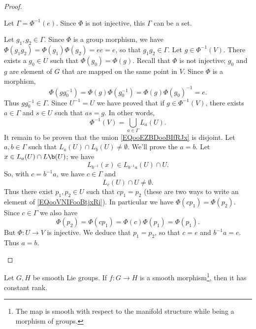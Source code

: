 \begin{theorem}
\begin{proof}
\begin{subproof}
		Let \( \Gamma=\Phi^{-1}(e)\). Since \( \Phi\) is not injective, this \( \Gamma\) can be a set.
		\begin{subproof}
			Let \( g_1,g_2\in \Gamma\). Since \( \Phi\) is a group morphism, we have \( \Phi(g_1g_2)=\Phi(g_1)\Phi(g_2)=ee=e\), so that \( g_1g_2\in \Gamma\).
			\spitem[As an union]
			Let \( g\in\Phi^{-1}(V)\). There exists a \( g_0\in U\) such that \( \Phi(g_0)=\Phi(g)\). Recall that \( \Phi\) is not injective; \( g_0\) and \( g\) are element of \( G\) that are mapped on the same point in \( V\). Since \( \Phi\) is a morphism,
			\begin{equation}
				\Phi(gg_0^{-1})=\Phi(g)\Phi(g_0^{-1})=\Phi(g)\Phi(g_0)^{-1}=e.
			\end{equation}
			Thus \( gg_0^{-1}\in \Gamma\). Since \( U^{-1}=U\) we have proved that if \( g\in \Phi^{-1}(V)\), there exists \( a\in \Gamma\) and \( s\in U\) such that \( as=g\). In other words,
			\begin{equation}        \label{EQooEZBDooBIfRJx}
				\Phi^{-1}(V)=\bigcup_{a\in \Gamma}L_a(U).
			\end{equation}
			\spitem[Disjoint]
			It remain to be proven that the union \eqref{EQooEZBDooBIfRJx} is disjoint. Let \( a,b\in \Gamma\) such that \( L_a(U)\cap L_b(U)\neq \emptyset\). We'll prove the \( a=b\). Let \( x\in L_a(U)\cap L\b(U)\); we have
			\begin{equation}
				L_{b^{-1}}(x)\in L_{b^{-1} a}(U)\cap U.
			\end{equation}
			So, with \( c=b^{-1} a\), we have \( c\in\Gamma\) and
			\begin{equation}        \label{EQooVNIFooBtjxRi}
				L_c(U)\cap U\neq\emptyset.
			\end{equation}
			Thus there exist \( p_1,p_2\in U\) such that \( cp_1=p_2\) (these are two ways to write an element of \eqref{EQooVNIFooBtjxRi}). In particular we have \( \Phi(cp_1)=\Phi(p_2)\). Since \( c\in \Gamma\) we also have
			\begin{equation}
				\Phi(p_2)= \Phi(cp_1)=\Phi(c)\Phi(p_1)=\Phi(p_1).
			\end{equation}
			But \( \Phi\colon U\to V\) is injective. We deduce that \( p_1=p_2\), so that \( c=e\) and \( b^{-1}a=e\). Thus \( a=b\).
		\end{subproof}
	\end{subproof}
\end{proof}

\begin{proposition}        \label{PROPooIORNooLeuXPW}
	Let \( G,H\) be smooth Lie groups. If \( f\colon G\to H\) is a smooth morphism\footnote{The map is smooth with respect to the manifold structure while being a morphism of groups.}, then it has constant rank.
\end{proposition}


\end{theorem}
